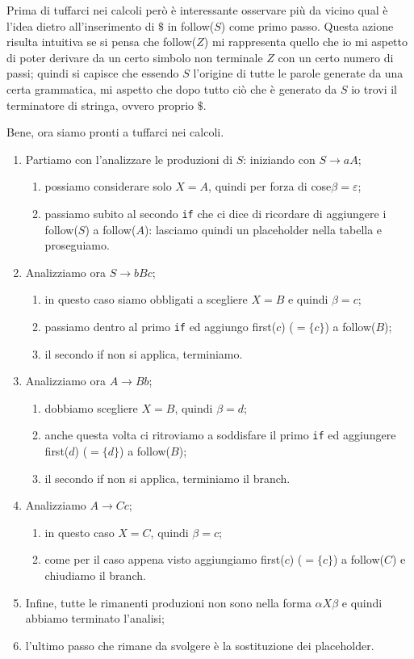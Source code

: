 \documentclass[class=book, crop=false, oneside, 12pt]{standalone}
\begin{document}
Prima di tuffarci nei calcoli però è interessante osservare più da vicino qual è l’idea dietro all'inserimento di \(\$\) in follow(\(S\)) come primo passo.
Questa azione risulta intuitiva se si pensa che follow(\(Z\)) mi rappresenta quello che io mi aspetto di poter derivare da un certo simbolo non terminale \(Z\) con un certo numero di passi; quindi si capisce che essendo \(S\) l’origine di tutte le parole generate da una certa grammatica, mi aspetto che dopo tutto ciò che è generato da \(S\) io trovi il terminatore di stringa, ovvero proprio \(\$\).

\noindent Bene, ora siamo pronti a tuffarci nei calcoli.
\begin{enumerate}
    \item Partiamo con l’analizzare le produzioni di \(S\): iniziando con \(S \to aA\);
    \begin{enumerate}
        \item possiamo considerare solo \(X = A\), quindi per forza di cose\(\beta = \varepsilon\);
        \item passiamo subito al secondo \texttt{if} che ci dice di ricordare di aggiungere i follow(\(S\)) a follow(\(A\)): lasciamo quindi un placeholder nella tabella e proseguiamo.
    \end{enumerate}
    \item Analizziamo ora \(S \to bBc\);
    \begin{enumerate}
        \item in questo caso siamo obbligati a scegliere \(X = B\) e quindi \(\beta = c\);
        \item passiamo dentro al primo \texttt{if} ed aggiungo first(\(c\)) (\(=\{c\}\)) a follow(\(B\));
        \item il secondo if non si applica, terminiamo.
    \end{enumerate}
    \item Analizziamo ora \(A \to Bb\);
    \begin{enumerate}
        \item dobbiamo scegliere \(X = B\), quindi \(\beta = d\);
        \item anche questa volta ci ritroviamo a soddisfare il primo \texttt{if} ed aggiungere first(\(d\)) (\(=\{d\}\)) a follow(\(B\));
        \item il secondo if non si applica, terminiamo il branch.
    \end{enumerate}
    \item Analizziamo \(A \to Cc\);
    \begin{enumerate}
        \item in questo caso \(X = C\), quindi \(\beta = c\);
        \item come per il caso appena visto aggiungiamo first(\(c\)) (\(=\{c\}\)) a follow(\(C\)) e chiudiamo il branch.
    \end{enumerate}
    \item Infine, tutte le rimanenti produzioni non sono nella forma \(\alpha X \beta\) e quindi abbiamo terminato l’analisi;
    \item l'ultimo passo che rimane da svolgere è la sostituzione dei placeholder.
\end{enumerate}
\end{document}
